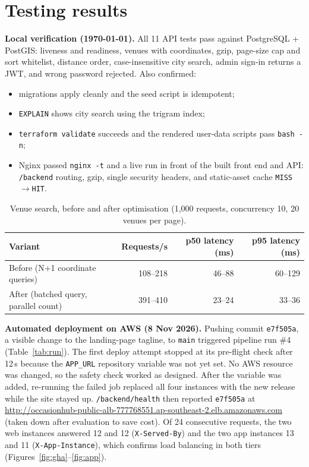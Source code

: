 \documentclass[10pt,a4paper]{article}
\newcommand{\appurl}{\url{http://occasionhub-public-alb-777768551.ap-southeast-2.elb.amazonaws.com}}
\begin{document}
\section{Testing results}\label{sec:test}
\textbf{Local verification (\today).} All 11 API tests pass against
PostgreSQL + PostGIS: liveness and readiness, venues with coordinates, gzip,
page-size cap and sort whitelist, distance order, case-insensitive city search,
admin sign-in returns a JWT, and wrong password rejected. Also confirmed:
\begin{itemize}
  \item migrations apply cleanly and the seed script is idempotent;
  \item \texttt{EXPLAIN} shows city search using the trigram index;
  \item \texttt{terraform validate} succeeds and the rendered user-data scripts
  pass \texttt{bash -n};
  \item Nginx passed \texttt{nginx -t} and a live run in front of the built
  front end and API: \texttt{/backend} routing, gzip, single security headers,
  and static-asset cache \texttt{MISS}$\rightarrow$\texttt{HIT}.
\end{itemize}

\begin{table}[H]\centering\small
\caption{Venue search, before and after optimisation (1{,}000 requests, concurrency 10, 20 venues per page).}\label{tab:bench}
\begin{tabularx}{\linewidth}{@{}L r r r@{}}
\toprule
Variant & Requests/s & p50 latency (ms) & p95 latency (ms) \\
\midrule
Before (N+1 coordinate queries) & 108--218 & 46--88 & 60--129 \\
After (batched query, parallel count) & 391--410 & 23--24 & 33--36 \\
\bottomrule
\end{tabularx}
\end{table}

\textbf{Automated deployment on AWS (8 Nov 2026).} Pushing commit
\texttt{e7f505a}, a visible change to the landing-page tagline, to
\texttt{main} triggered pipeline run \#4 (Table~\ref{tab:run}). The first deploy
attempt stopped at its pre-flight check after 12\,s because the
\texttt{APP\_URL} repository variable was not yet set. No AWS resource was
changed, so the safety check worked as designed. After the variable was added,
re-running the failed job replaced all four instances with the new release while
the site stayed up. \texttt{/backend/health} then reported \texttt{e7f505a} at
\appurl{} (taken down after evaluation to save cost). Of 24 consecutive requests,
the two web instances answered 12 and 12 (\texttt{X-Served-By}) and the two app
instances 13 and 11 (\texttt{X-App-Instance}), which confirms load balancing in
both tiers (Figures~\ref{fig:gha}--\ref{fig:app}).
\end{document}
